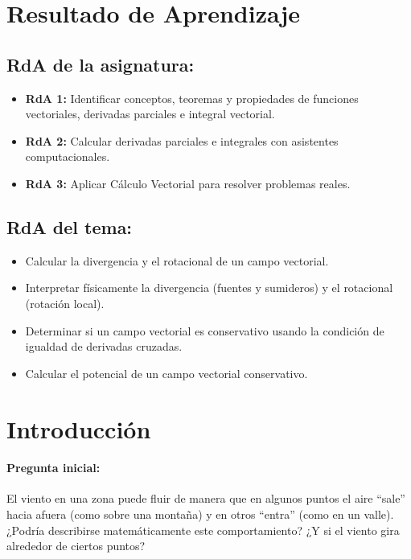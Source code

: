 \documentclass[a4,11pt]{aleph-notas}
\begin{document}
\encabezado

\section*{Resultado de Aprendizaje}

\subsection*{RdA de la asignatura:}
\begin{itemize}[leftmargin=*]
    \item \textbf{RdA 1:} Identificar conceptos, teoremas y propiedades de funciones vectoriales, derivadas parciales e integral vectorial.
    \item \textbf{RdA 2:} Calcular derivadas parciales e integrales con asistentes computacionales.
    \item \textbf{RdA 3:} Aplicar Cálculo Vectorial para resolver problemas reales.
\end{itemize}

\subsection*{RdA del tema:}
\begin{itemize}[leftmargin=*]
    \item Calcular la divergencia y el rotacional de un campo vectorial.
    \item Interpretar físicamente la divergencia (fuentes y sumideros) y el rotacional (rotación local).
    \item Determinar si un campo vectorial es conservativo usando la condición de igualdad de derivadas cruzadas.
    \item Calcular el potencial de un campo vectorial conservativo.
\end{itemize}

\section*{Introducción}

\paragraph{Pregunta inicial:}
El viento en una zona puede fluir de manera que en algunos puntos el aire ``sale'' hacia afuera (como sobre una montaña) y en otros ``entra'' (como en un valle). ¿Podría describirse matemáticamente este comportamiento? ¿Y si el viento gira alrededor de ciertos puntos?
\end{document}
